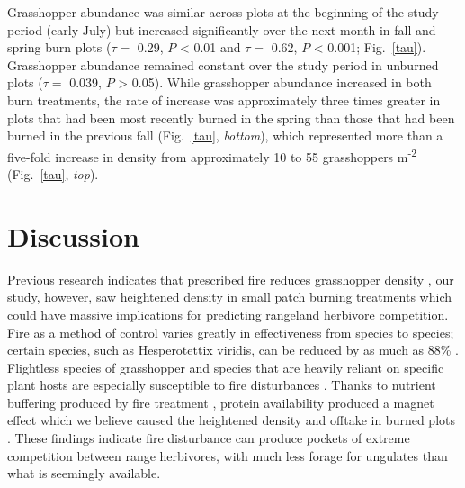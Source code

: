 \documentclass[referee, 
	            sn-basic]
           {sn-jnl}
\begin{document}
\begin{linenumbers}
Grasshopper abundance was similar across plots at the beginning of the study period (early July) but increased significantly over the next month in fall and spring burn plots (\(\tau =\) 0.29, \(P\) \textless{} 0.01 and \(\tau =\) 0.62, \(P\) \textless{} 0.001; Fig.~\ref{tau}). 
Grasshopper abundance remained constant over the study period in unburned plots (\(\tau =\) 0.039, \(P\) \textgreater{} 0.05). 
While grasshopper abundance increased in both burn treatments, the rate of increase was approximately three times greater in plots that had been most recently burned in the spring than those that had been burned in the previous fall (Fig.~\ref{tau}, \emph{bottom}), which represented more than a five-fold increase in density from approximately 10 to 55 grasshoppers m\textsuperscript{-2} (Fig.~\ref{tau}, \emph{top}).

\section{Discussion}

Previous research indicates that prescribed fire reduces grasshopper
density \citep{joern2004, vermeire2004}, our study, however, saw
heightened density in small patch burning treatments which could have
massive implications for predicting rangeland herbivore competition.
Fire as a method of control varies greatly in effectiveness from species
to species; certain species, such as Hesperotettix viridis, can be
reduced by as much as 88\% \citep{vermeire2004}. Flightless species of
grasshopper and species that are heavily reliant on specific plant hosts
are especially susceptible to fire disturbances \citep{matenaar2014}.
Thanks to nutrient buffering produced by fire treatment
\citep{spiess2020}, protein availability produced a magnet effect which
we believe caused the heightened density and offtake in burned plots
\citep{meyer2002}. These findings indicate fire disturbance can produce
pockets of extreme competition between range herbivores, with much less
forage for ungulates than what is seemingly available.


\end{linenumbers}
\end{document}
